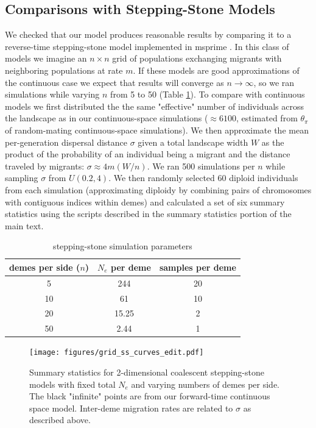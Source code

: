 \documentclass[10pt,twoside,lineno,hidelinks]{preprint}
\begin{document}
\subsection{Comparisons with Stepping-Stone Models}
We checked that our model produces reasonable results by comparing it to a reverse-time stepping-stone model implemented in msprime \citep{Kelleher2016}. In this class of models we imagine an $n \times n$ grid of populations exchanging migrants with neighboring populations at rate $m$. If these models are good approximations of the continuous case we expect that results will converge as $n \to \infty$, so we ran simulations while varying $n$ from 5 to 50 (Table \ref{table:grid_params}). To compare with continuous models we first distributed the the same "effective" number of individuals across the landscape as in our continuous-space simulations ($\approx 6100$, estimated from $\theta_{\pi}$ of random-mating continuous-space simulations). We then approximate the mean per-generation dispersal distance $\sigma$ given a total landscape width $W$ as the product of the probability of an individual being a migrant and the distance traveled by migrants: $\sigma \approx 4m(W/n)$. We ran 500 simulations per $n$ while sampling $\sigma$ from $U(0.2,4)$. We then randomly selected 60 diploid individuals from each simulation (approximating diploidy by combining pairs of chromosomes with contiguous indices within demes) and calculated a set of six summary statistics using the scripts described in the summary statistics portion of the main text. 

\begin{table}[h]
\centering
\begin{tabular}{ccc}
     demes per side ($n$)&$N_e$ per deme  & samples per deme  \\
     \hline
     5 & 244 & 20 \\
     10 & 61 & 10 \\
     20 & 15.25 & 2 \\
     50 & 2.44 & 1 \\
\end{tabular}
\captionsetup{justification=centering}
\caption{stepping-stone simulation parameters}
\label{table:grid_params}
\end{table}


\begin{figure}[h]
\centering
\texttt{[image: figures/grid\_ss\_curves\_edit.pdf]}
\caption{Summary statistics for 2-dimensional coalescent stepping-stone models with fixed total $N_{e}$ and varying numbers of demes per side. The black "infinite" points are from our forward-time continuous space model. Inter-deme migration rates are related to $\sigma$ as described above.}
\label{fig:grid_stats}
\end{figure}
\end{document}
